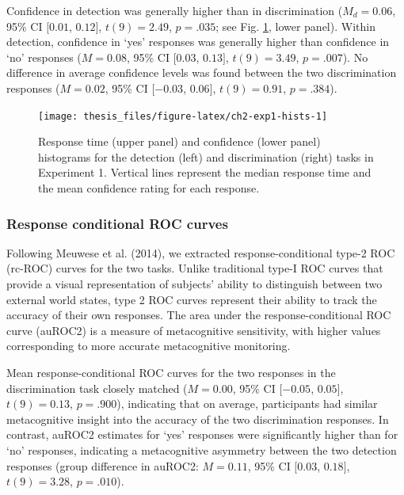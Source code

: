 \documentclass[12pt,twoside]{reedthesis}
\begin{document}
Confidence in detection was generally higher than in discrimination (\(M_d = 0.06\), 95\% CI \([0.01\), \(0.12]\), \(t(9) = 2.49\), \(p = .035\); see Fig. \ref{fig:ch2-exp1-hists}, lower panel). Within detection, confidence in `yes' responses was generally higher than confidence in `no' responses (\(M = 0.08\), 95\% CI \([0.03\), \(0.13]\), \(t(9) = 3.49\), \(p = .007\)). No difference in average confidence levels was found between the two discrimination responses (\(M = 0.02\), 95\% CI \([-0.03\), \(0.06]\), \(t(9) = 0.91\), \(p = .384\)).
\begin{figure}
\texttt{[image: thesis\_files/figure-latex/ch2-exp1-hists-1]} \caption[Response time and Confidence histograms for Experiment 1]{Response time (upper panel) and confidence (lower panel) histograms for the detection (left) and discrimination (right) tasks in Experiment 1. Vertical lines represent the median response time and the mean confidence rating for each response.}\label{fig:ch2-exp1-hists}
\end{figure}
\hypertarget{response-conditional-roc-curves}{%
\subsubsection{Response conditional ROC curves}\label{response-conditional-roc-curves}}

Following Meuwese et al. (2014), we extracted response-conditional type-2 ROC (rc-ROC) curves for the two tasks. Unlike traditional type-I ROC curves that provide a visual representation of subjects' ability to distinguish between two external world states, type 2 ROC curves represent their ability to track the accuracy of their own responses. The area under the response-conditional ROC curve (auROC2) is a measure of metacognitive sensitivity, with higher values corresponding to more accurate metacognitive monitoring.

Mean response-conditional ROC curves for the two responses in the discrimination task closely matched (\(M = 0.00\), 95\% CI \([-0.05\), \(0.05]\), \(t(9) = 0.13\), \(p = .900\)), indicating that on average, participants had similar metacognitive insight into the accuracy of the two discrimination responses. In contrast, auROC2 estimates for `yes' responses were significantly higher than for `no' responses, indicating a metacognitive asymmetry between the two detection responses (group difference in auROC2: \(M = 0.11\), 95\% CI \([0.03\), \(0.18]\), \(t(9) = 3.28\), \(p = .010\)).
\end{document}
